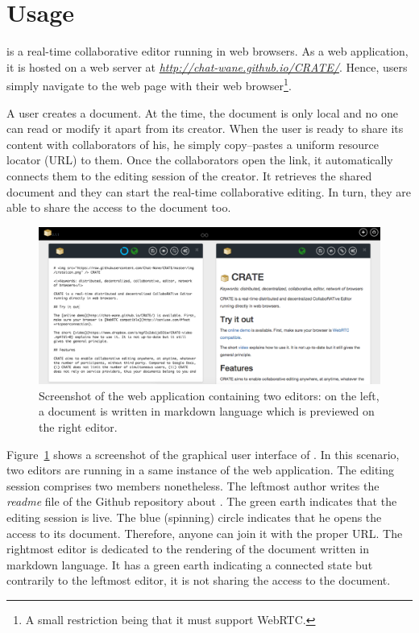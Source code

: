 
\section{Usage}

\CRATE is a real-time collaborative editor running in web browsers. As a web
application, it is hosted on a web server at
\emph{\url{http://chat-wane.github.io/CRATE/}}. Hence, users simply navigate to
the web page with their web browser\footnote{A small restriction being that it
  must support WebRTC.}.

A user creates a document. At the time, the document is only local and no one
can read or modify it apart from its creator. When the user is ready to share
its content with collaborators of his, he simply copy--pastes a uniform resource
locator (URL) to them. Once the collaborators open the link, it automatically
connects them to the editing session of the creator. It retrieves the shared
document and they can start the real-time collaborative editing. In turn, they
are able to share the access to the document too.

\begin{figure}
  \includegraphics[width=\textwidth]{./img/screenshot.png}
  \caption{\label{img:screenshot} Screenshot of the web application containing
    two editors: on the left, a document is written in markdown language which
    is previewed on the right editor.}
\end{figure}

Figure~\ref{img:screenshot} shows a screenshot of the graphical user interface
of \CRATE. In this scenario, two editors are running in a same instance of the
web application. The editing session comprises two members nonetheless. The
leftmost author writes the \emph{readme} file of the Github repository about
\CRATE. The green earth indicates that the editing session is live. The blue
(spinning) circle indicates that he opens the access to its document. Therefore,
anyone can join it with the proper URL. The rightmost editor is dedicated to the
rendering of the document written in markdown language. It has a green earth
indicating a connected state but contrarily to the leftmost editor, it is not
sharing the access to the document.

